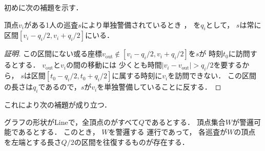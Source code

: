 初めに次の補題を示す．

\begin{lemm}
	\label{lemm:movableAreaofPatrolleronLine}
	頂点$v_i$がある1人の巡査$s$により単独警備されているとき
	，
	{\timelimit}を$q_i$として，
		$s$は常に区間$[v_i - q_i/2, v_i + q_i/2]$にいる．
\end{lemm}

\begin{proof}[証明]
	\newcommand{\vout}{v_{\mathrm{out}}}
	この区間にない或る座標$\vout \notin [v_i - q_i/2, v_i + q_i/2]$を$s$が
	時刻$t_0$に訪問するとする．
	$\vout$と$v_i$の間の移動には
	少くとも時間$\lvert v_i - \vout \rvert > q _i / 2$を要するから，
	$s$は区間$[t_0 - q _i / 2, t_0 + q _i / 2]$に属する時刻に$v_i$を訪問できない．
	この区間の長さは$
		q_i
	$であるので，$s$が$v _i$を単独警備していることに反する．
\end{proof}



これにより次の補題が成り立つ．


\begin{lemm}
	\label{lemm:LineEqualTimelimitIndependentInterval}
	グラフの形状がLineで，全頂点の{\timelimit}がすべて$Q$であるとする．
	頂点集合$W$が警邏可能であるとする．
	このとき，
	$W$を警邏する
	運行であって，
        各巡査が$W$の頂点を左端とする長さ$Q / 2$の区間を往復するものが存在する．
\end{lemm}


